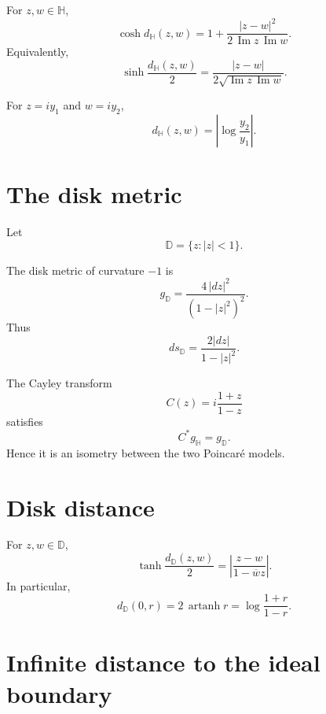 \begin{theorem}\label{thm:vii32-distance}
For \(z,w\in\mathbb H\),
\[
\cosh d_{\mathbb H}(z,w)
=
1+\frac{|z-w|^2}{2\,\operatorname{Im}z\,\operatorname{Im}w}.
\]
Equivalently,
\[
\sinh\frac{d_{\mathbb H}(z,w)}2
=
\frac{|z-w|}
{2\sqrt{\operatorname{Im}z\,\operatorname{Im}w}}.
\]
\end{theorem}

\begin{example}\label{ex:vii32-vertical-distance}
For \(z=iy_1\) and \(w=iy_2\),
\[
d_{\mathbb H}(z,w)
=
\left|\log\frac{y_2}{y_1}\right|.
\]
\end{example}

\section{The disk metric}

Let
\[
\mathbb D=\{z:|z|<1\}.
\]

\begin{definition}\label{def:vii32-disk-metric}
The disk metric of curvature \(-1\) is
\[
g_{\mathbb D}
=
\frac{4\,|dz|^2}{(1-|z|^2)^2}.
\]
Thus
\[
ds_{\mathbb D}
=
\frac{2|dz|}{1-|z|^2}.
\]
\end{definition}

\begin{proposition}\label{prop:vii32-cayley-isometry}
The Cayley transform
\[
C(z)=i\frac{1+z}{1-z}
\]
satisfies
\[
C^*g_{\mathbb H}=g_{\mathbb D}.
\]
Hence it is an isometry between the two Poincaré models.
\end{proposition}

\section{Disk distance}

\begin{theorem}\label{thm:vii32-disk-distance}
For \(z,w\in\mathbb D\),
\[
\tanh\frac{d_{\mathbb D}(z,w)}2
=
\left|
\frac{z-w}{1-\overline w z}
\right|.
\]
In particular,
\[
d_{\mathbb D}(0,r)
=
2\,\operatorname{artanh}r
=
\log\frac{1+r}{1-r}.
\]
\end{theorem}

\section{Infinite distance to the ideal boundary}

